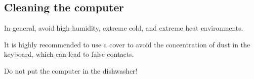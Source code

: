     \subsection{Cleaning the computer}

    In general, avoid high humidity, extreme cold, and extreme heat environments.

    It is highly recommended to use a cover to avoid the concentration of dust
    in the keyboard, which can lead to false contacts.

    Do not put the computer in the dishwasher!